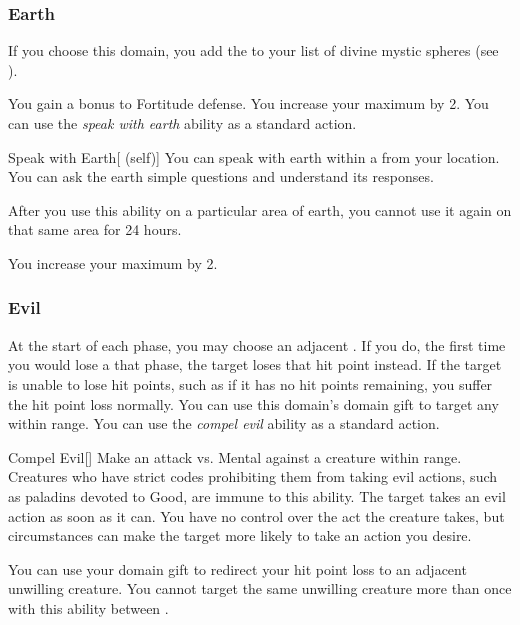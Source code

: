         \subsubsection{Earth}
            If you choose this domain, you add the   to your list of divine mystic spheres (see ).

             You gain a  bonus to Fortitude defense.
             You increase your maximum  by 2.
             You can use the \textit{speak with earth} ability as a standard action.
            \begin{attuneability}{Speak with Earth}[ (self)]
                You can speak with earth within a \areahuge {} from your location.
                You can ask the earth simple questions and understand its responses.

                After you use this ability on a particular area of earth, you cannot use it again on that same area for 24 hours.
            \end{attuneability}
             You increase your maximum  by 2.

        \subsubsection{Evil}
             At the start of each phase, you may choose an adjacent .
            If you do, the first time you would lose a  that phase, the target loses that hit point instead.
            If the target is unable to lose hit points, such as if it has no hit points remaining, you suffer the hit point loss normally.
             You can use this domain's domain gift to target any  within \rngmed range.
             You can use the \textit{compel evil} ability as a standard action.
            \begin{freeability}{Compel Evil}[]
                Make an attack vs. Mental against a creature within \rngmed range.
                Creatures who have strict codes prohibiting them from taking evil actions, such as paladins devoted to Good, are immune to this ability.
                \hit The target takes an evil action as soon as it can.
                You have no control over the act the creature takes, but circumstances can make the target more likely to take an action you desire.
            \end{freeability}
             You can use your domain gift to redirect your hit point loss to an adjacent unwilling creature.
            You cannot target the same unwilling creature more than once with this ability between .

